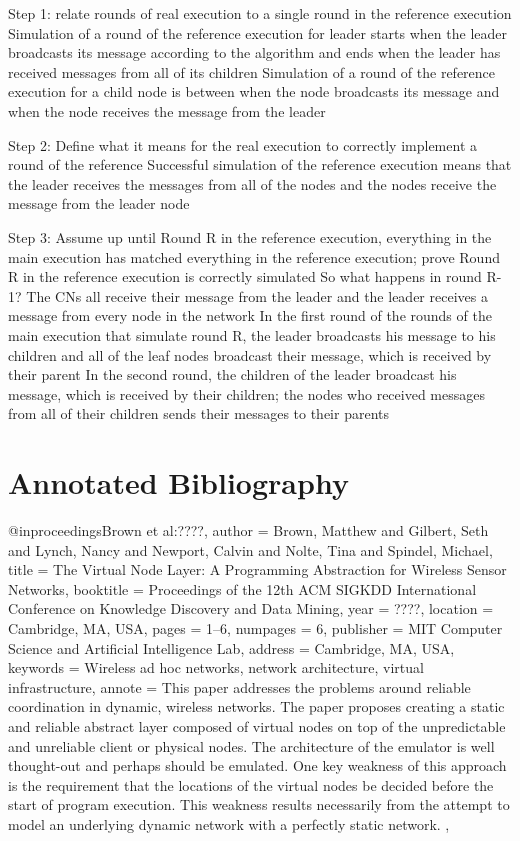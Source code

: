 \documentclass[english]{article}
\begin{document}
Step 1: relate rounds of real execution to a single round in the reference execution \;
Simulation of a round of the reference execution for leader starts when the leader broadcasts its message according to the algorithm and ends when the leader has received messages from all of its children \;
Simulation of a round of the reference execution for a child node is between when the node broadcasts its message and when the node receives the message from the leader \;

Step 2: Define what it means for the real execution to correctly implement a round of the reference \;
Successful simulation of the reference execution means that the leader receives the messages from all of the nodes and the nodes receive the message from the leader node \;

Step 3: Assume up until Round R in the reference execution, everything in the main execution has matched everything in the reference execution; prove Round R in the reference execution is correctly simulated \;
So what happens in round R-1? The CNs all receive their message from the leader and the leader receives a message from every node in the network \;
In the first round of the rounds of the main execution that simulate round R, the leader broadcasts his message to his children and all of the leaf nodes broadcast their message, which is received by their parent \;
In the second round, the children of the leader broadcast his message, which is received by their children; the nodes who received messages from all of their children sends their messages to their parents \;



\section{Annotated Bibliography}



@inproceedings{Brown et al:????,
 author = {Brown, Matthew and Gilbert, Seth and Lynch, Nancy and Newport, Calvin and Nolte, Tina and Spindel, Michael},
 title = {The Virtual Node Layer: A Programming Abstraction for Wireless Sensor Networks},
 booktitle = {Proceedings of the 12th ACM SIGKDD International Conference on Knowledge Discovery and Data Mining},
 year = {????},
 location = {Cambridge, MA, USA},
 pages = {1--6},
 numpages = {6},
 publisher = {MIT Computer Science and Artificial Intelligence Lab},
 address = {Cambridge, MA, USA},
 keywords = {Wireless ad hoc networks, network architecture, virtual infrastructure},
 annote = {This paper addresses the problems around reliable coordination in dynamic, wireless networks. The paper proposes creating a static and reliable abstract layer composed of virtual nodes on top of the unpredictable and unreliable client or physical nodes. The architecture of the emulator is well thought-out and perhaps should be emulated. One key weakness of this approach is the requirement that the locations of the virtual nodes be decided before the start of program execution. This weakness results necessarily from the attempt to model an underlying dynamic network with a perfectly static network. },
}
\end{document}
